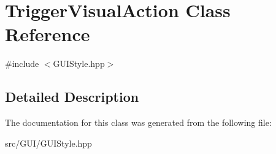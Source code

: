 \hypertarget{class_trigger_visual_action}{}\section{Trigger\+Visual\+Action Class Reference}
\label{class_trigger_visual_action}


{\ttfamily \#include $<$G\+U\+I\+Style.\+hpp$>$}



\subsection{Detailed Description}


The documentation for this class was generated from the following file\+:\begin{DoxyCompactItemize}
\item 
src/\+G\+U\+I/G\+U\+I\+Style.\+hpp\end{DoxyCompactItemize}
